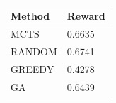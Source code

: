 \begin{tabular}{ll}
\hline
Method & Reward \\
\hline
  MCTS & 0.6635 \\
  RANDOM & 0.6741 \\
  GREEDY & 0.4278 \\
  GA & 0.6439 \\
\hline
\end{tabular}
